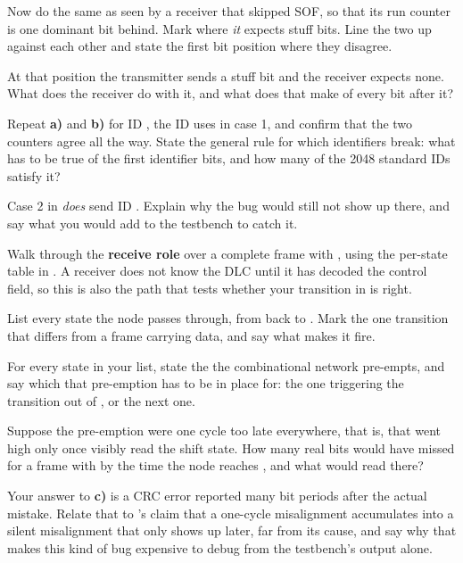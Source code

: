  Now do the same as seen by a receiver that skipped SOF, so that its run counter is one
dominant bit behind. Mark where \emph{it} expects stuff bits. Line the two up against each other and
state the first bit position where they disagree.

 At that position the transmitter sends a stuff bit and the receiver expects none. What does
the receiver do with it, and what does that make of every bit after it?

 Repeat \textbf{a)} and \textbf{b)} for ID , the ID  uses
in case 1, and confirm that the two counters agree all the way. State the general rule for which
identifiers break: what has to be true of the first identifier bits, and how many of the 2048 standard
IDs satisfy it?

 Case 2 in  \emph{does} send ID . Explain why the bug
would still not show up there, and say what you would add to the testbench to catch it.

\label{c17:ex:dlc0}
Walk through the \textbf{receive role} over a complete frame with , using the per-state
table in . A receiver does not know the DLC until it has decoded the control
field, so this is also the path that tests whether your transition in  is right.

 List every state the node passes through, from  back to
. Mark the one transition that differs from a frame carrying data, and say what makes
it fire.

 For every  state in your list, state the  the
combinational network pre-empts, and say which  that pre-emption has to be in place
for: the one triggering the transition out of , or the next one.

 Suppose the pre-emption were one cycle too late everywhere, that is, that 
went high only once  visibly read the shift state. How many real bits would
 have missed for a frame with  by the time the node reaches
, and what would  read there?

 Your answer to \textbf{c)} is a CRC error reported many bit periods after the actual
mistake. Relate that to 's claim that a one-cycle misalignment accumulates
into a silent misalignment that only shows up later, far from its cause, and say why that makes this
kind of bug expensive to debug from the testbench's output alone.
